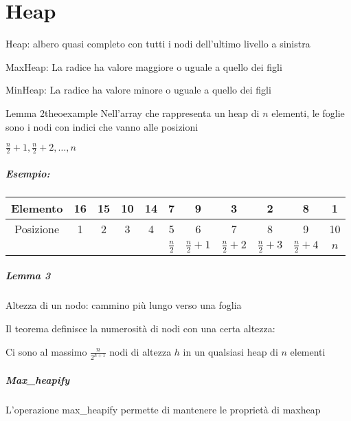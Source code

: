 \chapter{Heap}

{Heap: albero quasi completo con tutti i nodi dell'ultimo livello a sinistra}

{MaxHeap: La radice ha valore maggiore o uguale a quello dei figli}

{MinHeap: La radice ha valore minore o uguale a quello dei figli}


\begin{lemma}{Lemma 2}{theoexample}
Nell'array che rappresenta un heap di $n$ elementi, le foglie sono i nodi con indici che vanno alle posizioni

$\frac{n}{2}+1,\frac{n}{2}+2,\ldots,n$

\end{lemma}

\paragraph{Esempio:}



\begin{tabular}{|c|c|c|c|c|c|c|c|c|c|c|}
\hline
Elemento & 16 & 15 & 10 & 14 & 7 & 9 & 3 & 2 & 8 & 1 \\
\hline
Posizione & 1 & 2 & 3 & 4 & 5 & 6 & 7 & 8 & 9 & 10 \\
\hline
 &  &  &  &  & $\frac{n}{2}$ & $\frac{n}{2}+1$ & $\frac{n}{2}+2$ & $\frac{n}{2}+3$ & $\frac{n}{2}+4$ & $n$ \\
\hline
\end{tabular}

\paragraph{Lemma 3}

{Altezza di un nodo: cammino più lungo verso una foglia}

{Il teorema definisce la numerosità di nodi con una certa altezza:}

{Ci sono al massimo $\frac{n}{2^{h+1}}$ nodi di altezza $h$ in
un qualsiasi heap di $n$ elementi}

\paragraph{Max\_heapify}

{L'operazione max\_heapify permette di mantenere le proprietà di maxheap}

